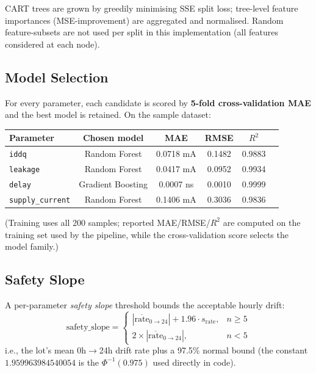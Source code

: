 \documentclass[11pt,a4paper]{article}
\newcommand{\code}[1]{\texttt{\small #1}}
\begin{document}
CART trees are grown by greedily minimising SSE split loss; tree-level feature importances
(MSE-improvement) are aggregated and normalised. Random feature-subsets are not used per split
in this implementation (all features considered at each node).

\subsection{Model Selection}
For every parameter, each candidate is scored by \textbf{5-fold cross-validation MAE} and the
best model is retained. On the sample dataset:

\begin{center}
\begin{tabular}{lccccc}
  \toprule
  \textbf{Parameter} & \textbf{Chosen model} & \textbf{MAE} & \textbf{RMSE} & \textbf{$R^2$} \\
  \midrule
  \code{iddq}          & Random Forest       & 0.0718 mA  & 0.1482 & 0.9883 \\
  \code{leakage}       & Random Forest       & 0.0417 mA  & 0.0952 & 0.9934 \\
  \code{delay}         & Gradient Boosting   & 0.0007 ns  & 0.0010 & 0.9999 \\
  \code{supply\_current} & Random Forest     & 0.1406 mA  & 0.3036 & 0.9836 \\
  \bottomrule
\end{tabular}
\end{center}

(Training uses all 200 samples; reported MAE/RMSE/$R^2$ are computed on the training set used
by the pipeline, while the cross-validation score selects the model family.)

\subsection{Safety Slope}
A per-parameter \emph{safety slope} threshold bounds the acceptable hourly drift:
\[
\text{safety\_slope} =
\begin{cases}
|\overline{\text{rate}}_{0\to24}| + 1.96 \cdot s_{\text{rate}}, & n \ge 5 \\
2 \times |\overline{\text{rate}}_{0\to24}|, & n < 5
\end{cases}
\]
i.e., the lot's mean 0h$\to$24h drift rate plus a 97.5\% normal bound (the constant
$1.959963984540054$ is the $\Phi^{-1}(0.975)$ used directly in code).
\end{document}
